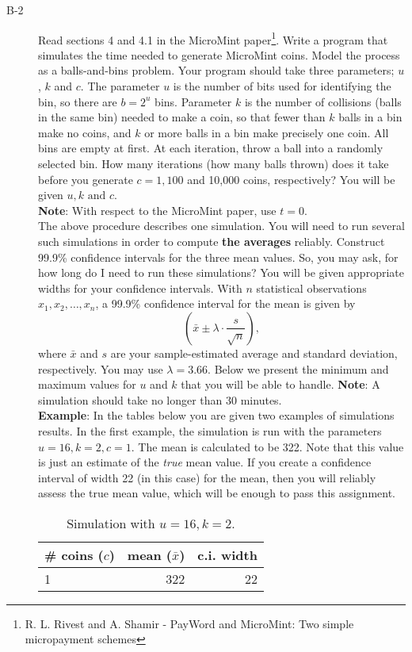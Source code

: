 \documentclass{article}
\begin{document}
\begin{description}
	\item[B-2]{Read sections 4 and 4.1 in the MicroMint paper\footnote{R. L. Rivest and A. Shamir - PayWord and MicroMint: Two simple micropayment schemes}.
	Write a program that simulates the time needed to generate MicroMint coins.
	Model the process as a balls-and-bins problem.
	Your program should take three parameters; $u$, $k$ and $c$.
	The parameter $u$ is the number of bits used for identifying the bin, so there are $b=2^u$ bins.
	Parameter $k$ is the number of collisions (balls in the same bin) needed to make a coin, so that fewer than $k$ balls in a bin make no coins, 
	and $k$ or more balls in a bin make precisely one coin.
	All bins are empty at first.
	At each iteration, throw a ball into a randomly selected bin.
	How many iterations (how many balls thrown) does it take before you generate $c = 1, 100$ and 10,000 coins, respectively?
	You will be given $u, k \textrm{ and } c$.\\
	\textbf{Note}: With respect to the MicroMint paper, use $t=0$.\\
	The above procedure describes one simulation.
	You will need to run several such simulations in order to compute \textbf{the averages} reliably.
	Construct 99.9\% confidence intervals for the three mean values.
	So, you may ask, for how long do I need to run these simulations?
	You will be given appropriate widths for your confidence intervals.
	With $n$ statistical observations $x_1, x_2,\ldots, x_n$, a 99.9\% confidence interval for the mean is given by
	\[\left(\bar{x}\pm\lambda\cdot\frac{s}{\sqrt{n}}\right),\]
	where $\bar{x}$ and $s$ are your sample-estimated average and standard deviation, respectively.
	You may use $\lambda=3.66$.
	Below we present the minimum and maximum values for $u$ and $k$
	that you will be able to handle. \textbf{Note}: A simulation should take no longer than 30 minutes.\\
	\textbf{Example}: In the tables below you are given two examples of simulations results. 
	In the first example,
	the simulation is run with the parameters $u = 16, k = 2, c = 1$. The mean is calculated to be 322.
	Note that this value is just an estimate of the \textit{true} mean value. 
	If you create a confidence interval of width 22 (in this case) for the mean, 
	then you will reliably assess the true mean value, which will be enough to pass this assignment.

	\begin{table}[h]
	\centering
	\caption{Simulation with $u = 16, k = 2$.}
	\begin{tabular}{lrr}
	\toprule
	\# coins ($c$) & mean ($\bar{x}$) & c.i. width \\
	\midrule
	1      &        322 &       22 \\


\end{tabular}
\end{table}}
\end{description}
\end{document}
